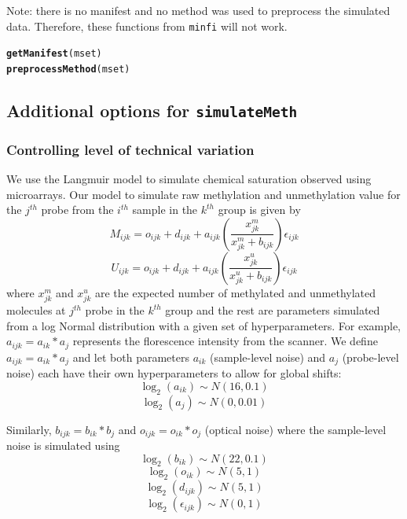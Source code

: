 \documentclass{article}\usepackage[]{graphicx}\usepackage[usenames,dvipsnames]{color}
\makeatletter
\newcommand{\hlstd}[1]{\textcolor[rgb]{0.345,0.345,0.345}{#1}}%
\newcommand{\hlkwd}[1]{\textcolor[rgb]{0.737,0.353,0.396}{\textbf{#1}}}%
\newenvironment{kframe}{%
 \def\at@end@of@kframe{}%
 \ifinner\ifhmode%
  \def\at@end@of@kframe{\end{minipage}}%
  \begin{minipage}{\columnwidth}%
 \fi\fi%
 \def\FrameCommand##1{\hskip\@totalleftmargin \hskip-\fboxsep
 \colorbox{shadecolor}{##1}\hskip-\fboxsep
     \hskip-\linewidth \hskip-\@totalleftmargin \hskip\columnwidth}%
 \MakeFramed {\advance\hsize-\width
   \@totalleftmargin\z@ \linewidth\hsize
   \@setminipage}}%
 {\par\unskip\endMakeFramed%
 \at@end@of@kframe}
\newenvironment{knitrout}{}{} %
\makeatother
\begin{document}
Note: there is no manifest and no method was used to preprocess the 
simulated data. Therefore, these functions from \texttt{minfi} will not work.  
\begin{knitrout}
\color{fgcolor}\begin{kframe}
\begin{alltt}
\hlkwd{getManifest}\hlstd{(mset)}
\hlkwd{preprocessMethod}\hlstd{(mset)}
\end{alltt}
\end{kframe}
\end{knitrout}

\subsection{Additional options for \texttt{simulateMeth}}

\subsubsection{Controlling level of technical variation}
We use the Langmuir model to simulate chemical saturation observed using 
microarrays. Our model to simulate raw methylation and unmethylation value 
for the $j^{th}$ probe from the $i^{th}$ sample in the $k^{th}$ group is 
given by
\[ M_{ijk} = o_{ijk} + d_{ijk} + a_{ijk} ( \frac{x_{jk}^m}{x_{jk}^m + b_{ijk}} ) \epsilon_{ijk} \]
\[ U_{ijk} = o_{ijk} + d_{ijk} + a_{ijk}  ( \frac{x_{jk}^u}{x_{jk}^u + b_{ijk}} ) \epsilon_{ijk} \]
where $x_{jk}^m$ and $x_{jk}^u$ are the expected number of methylated and 
unmethylated molecules at $j^{th}$ probe in the $k^{th}$ group and the rest 
are parameters simulated from a log Normal distribution with a given set of 
hyperparameters. For example, $a_{ijk} = a_{ik} * a_j$ represents the 
florescence intensity from the scanner. We define $a_{ijk} = a_{ik} * a_j$ 
and let both parameters $a_{ik}$ (sample-level noise) and $a_j$ 
(probe-level noise) each have their own hyperparameters to allow for 
global shifts: 
\[ \log_2(a_{ik}) \sim  N(16, 0.1) \]
\[ \log_2(a_{j}) \sim N(0, 0.01)  \]

Similarly, $b_{ijk} = b_{ik} * b_j$ and $o_{ijk} = o_{ik} * o_j$ 
(optical noise) where the sample-level noise is simulated using
\[ \log_2(b_{ik}) \sim  N(22, 0.1) \]
\[ \log_2(o_{ik}) \sim  N(5, 1) \]
\[ \log_2(d_{ijk}) \sim  N(5, 1) \]
\[ \log_2(\epsilon_{ijk}) \sim  N(0, 1) \]
\end{document}
